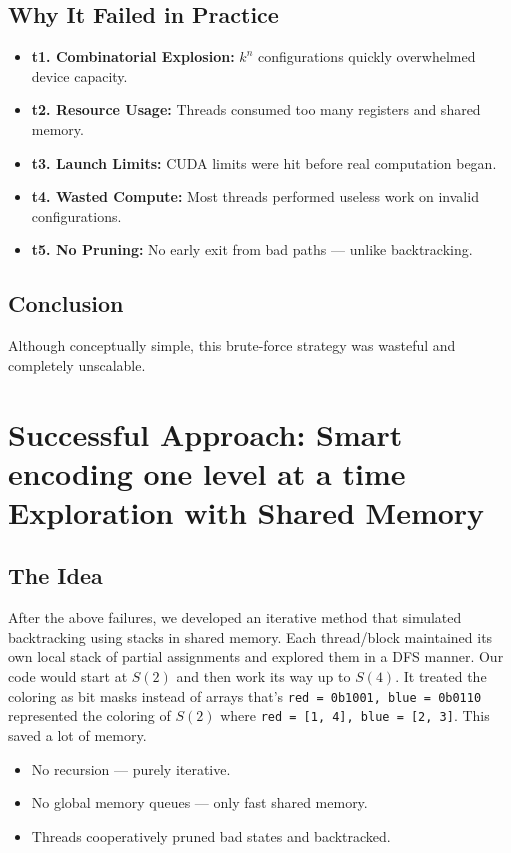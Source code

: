 \documentclass[12pt]{article}
\begin{document}
\subsection*{Why It Failed in Practice}
\begin{itemize}
    \item \textbf{t1. Combinatorial Explosion:} \(k^n\) configurations quickly overwhelmed device capacity.
    \item \textbf{t2. Resource Usage:} Threads consumed too many registers and shared memory.
    \item \textbf{t3. Launch Limits:} CUDA limits were hit before real computation began.
    \item \textbf{t4. Wasted Compute:} Most threads performed useless work on invalid configurations.
    \item \textbf{t5. No Pruning:} No early exit from bad paths — unlike backtracking.
\end{itemize}

\subsection*{Conclusion}
Although conceptually simple, this brute-force strategy was wasteful and completely unscalable.

\section*{Successful Approach: Smart encoding one level at a time Exploration with Shared Memory}

\subsection*{The Idea}
After the above failures, we developed an iterative method that simulated backtracking using stacks in shared memory. Each thread/block maintained its own local stack of partial assignments and explored them in a DFS manner. Our code would start at $S(2)$ and then work its way up to $S(4)$. 
It treated the coloring as bit masks instead of arrays that's \texttt{red = 0b1001, blue = 0b0110} represented the coloring of $S(2)$ where \texttt{red = [1, 4], blue = [2, 3]}. This saved a lot of memory.

\begin{itemize}
    \item No recursion — purely iterative.
    \item No global memory queues — only fast shared memory.
    \item Threads cooperatively pruned bad states and backtracked.
\end{itemize}
\end{document}
